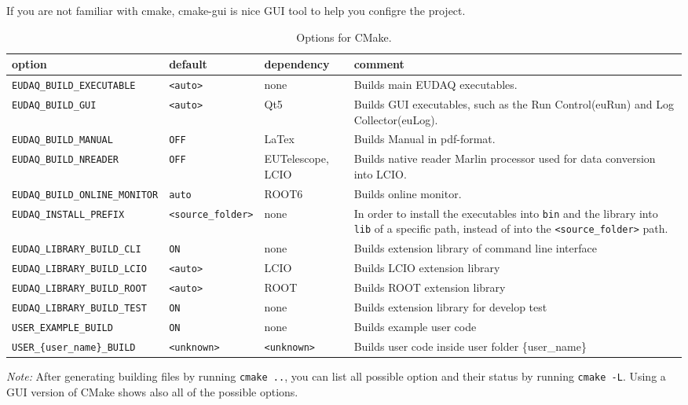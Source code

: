 If you are not familiar with cmake, cmake-gui is nice GUI tool to help you configre the project.

\begin{table}[!h]
{\footnotesize
\begin{tabular}{l|l|p{2cm}|p{5.5cm}}
option &  default &  dependency & comment \\
\hline
\texttt{EUDAQ\_BUILD\_EXECUTABLE} &  \texttt{<auto>} & none & Builds main EUDAQ executables.\\
\texttt{EUDAQ\_BUILD\_GUI} & \texttt{<auto>} & Qt5 & Builds GUI executables, such as the Run Control(euRun) and Log Collector(euLog).\\
\texttt{EUDAQ\_BUILD\_MANUAL} & \texttt{OFF} & LaTex &  Builds Manual in pdf-format.  \\
\texttt{EUDAQ\_BUILD\_NREADER} & \texttt{OFF} & EUTelescope, LCIO &  Builds native reader Marlin processor used for data conversion into LCIO.\\
\texttt{EUDAQ\_BUILD\_ONLINE\_MONITOR} & \texttt{auto} & ROOT6 &  Builds online monitor.  \\
\texttt{EUDAQ\_INSTALL\_PREFIX} & \texttt{<source\_folder>} & none & In order to install the executables into \texttt{bin} and the library into \texttt{lib} of a specific path, instead of into the \texttt{<source\_folder>} path.\\
\texttt{EUDAQ\_LIBRARY\_BUILD\_CLI} & \texttt{ON} & none & Builds extension library of command line interface\\
\texttt{EUDAQ\_LIBRARY\_BUILD\_LCIO} & \texttt{<auto>} & LCIO & Builds LCIO extension library\\
\texttt{EUDAQ\_LIBRARY\_BUILD\_ROOT} & \texttt{<auto>} & ROOT & Builds ROOT extension library\\
\texttt{EUDAQ\_LIBRARY\_BUILD\_TEST} & \texttt{ON} & none & Builds extension library for develop test\\
\texttt{USER\_EXAMPLE\_BUILD} & \texttt{ON} & none & Builds example user code\\
\texttt{USER\_\{user\_name\}\_BUILD} & \texttt{<unknown>} & \texttt{<unknown>} & Builds user code inside user folder \{user\_name\}\\
\end{tabular}
\caption{Options for CMake.}
\label{tab:cmakeoptions}
}
\end{table}

\textit{Note:} After generating building files by running \texttt{cmake ..}, you can list all possible option and their status by running \texttt{cmake -L}. 
Using a GUI version of CMake shows also all of the possible options.   

